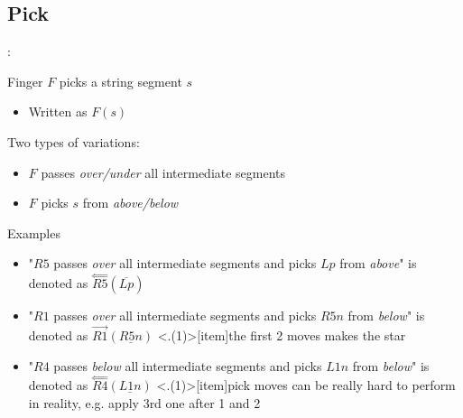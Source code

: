 \subsection{Pick}
\begin{frame}{\secname: \subsecname}

Finger $F$ picks a string segment $s$ 

\begin{itemize}
    \item Written as $F(s)$
\end{itemize}

\pause Two types of variations:
\begin{itemize}[<+(1)->]
    \item $F$ passes \emph{over/under} all intermediate segments
    \item $F$ picks $s$ from \emph{above/below}
\end{itemize}

\pause Examples
\begin{itemize}[<+(1)->]
    \item "$R5$ passes \emph{over} all intermediate segments and picks $Lp$ from \emph{above}" is denoted  as $\overset\Longleftarrow{R5}(\overline{Lp})$
    \item "$R1$ passes \emph{over} all intermediate segments and picks $R5n$ from \emph{below}" is denoted as $\overrightarrow{R1}(\underline{R5n})$
    \note<.(1)>[item]{the first 2 moves makes the star}
    \item "$R4$ passes \emph{below} all intermediate segments and picks $L1n$ from \emph{below}" is denoted as $\overset\Longleftarrow{R4}(\underline{L1n})$
    \note<.(1)>[item]{pick moves can be really hard to perform in reality, e.g. apply 3rd one after 1 and 2}
\end{itemize}
\end{frame}

